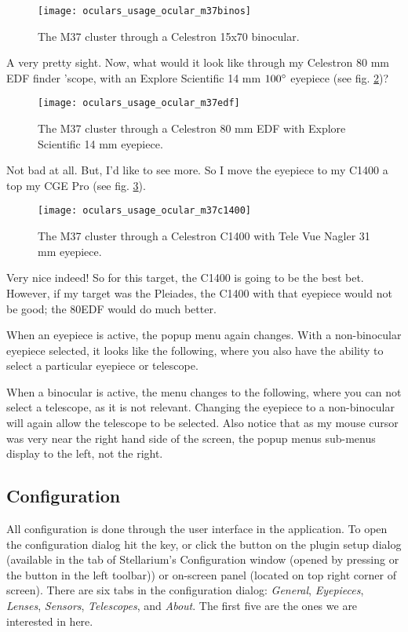 \begin{figure}[ht]\centering
\texttt{[image: oculars\_usage\_ocular\_m37binos]}
\caption{The M37 cluster through a Celestron 15x70 binocular.}
\label{fig:plugins:Oculars:Usage:Ocular:M37Binos}
\end{figure}

A very pretty sight. Now, what would it look like through my Celestron 80 mm EDF finder 'scope, with an Explore Scientific 14 mm $100\degree$ eyepiece (see fig. \ref{fig:plugins:Oculars:Usage:Ocular:M37EDF})?

\begin{figure}[ht]\centering
\texttt{[image: oculars\_usage\_ocular\_m37edf]}
\caption{The M37 cluster through a Celestron 80 mm EDF with Explore Scientific 14 mm eyepiece.}
\label{fig:plugins:Oculars:Usage:Ocular:M37EDF}
\end{figure}

Not bad at all. But, I'd like to see more. So I move the eyepiece to my C1400 a top my CGE Pro (see fig. \ref{fig:plugins:Oculars:Usage:Ocular:M37C1400}).

\begin{figure}[ht]\centering
\texttt{[image: oculars\_usage\_ocular\_m37c1400]}
\caption{The M37 cluster through a Celestron C1400 with Tele Vue Nagler 31 mm eyepiece.}
\label{fig:plugins:Oculars:Usage:Ocular:M37C1400}
\end{figure}

Very nice indeed! So for this target, the C1400 is going to be the best bet. However, if my target was the Pleiades, the C1400 with that eyepiece would not be good; the 80EDF would do much better.

When an eyepiece is active, the popup menu again changes. With a non-binocular eyepiece selected, it looks like the following, where you also have the ability to select a particular eyepiece or telescope.

When a binocular is active, the menu changes to the following, where you can not select a telescope, as it is not relevant. Changing the eyepiece to a non-binocular will again allow the telescope to be selected. Also notice that as my mouse cursor was very near the right hand side of the screen, the popup menus sub-menus display to the left, not the right.

\subsection{Configuration}
\label{sec:sec:plugins:Oculars:Configuration}
All configuration is done through the user interface in the application. To open the configuration dialog hit the  key, or click the  button on the plugin setup dialog (available in the
 tab of Stellarium's Configuration window (opened by 
pressing  or the  button in the left toolbar)) or on-screen panel (located on top right corner of screen). There are six tabs in the configuration dialog: \emph{General}, \emph{Eyepieces}, \emph{Lenses}, \emph{Sensors}, \emph{Telescopes}, and \emph{About}. The first five are the ones we are interested in here.

